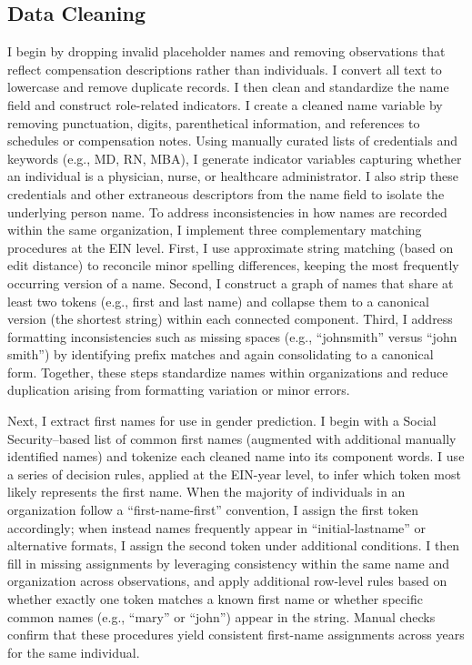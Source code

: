 \documentclass[12pt]{article}
\begin{document}
    \subsection{Data Cleaning}

    I begin by dropping invalid placeholder names and removing observations that reflect compensation descriptions rather than individuals. I convert all text to lowercase and remove duplicate records. I then clean and standardize the name field and construct role-related indicators. I create a cleaned name variable by removing punctuation, digits, parenthetical information, and references to schedules or compensation notes. Using manually curated lists of credentials and keywords (e.g., MD, RN, MBA), I generate indicator variables capturing whether an individual is a physician, nurse, or healthcare administrator. I also strip these credentials and other extraneous descriptors from the name field to isolate the underlying person name. To address inconsistencies in how names are recorded within the same organization, I implement three complementary matching procedures at the EIN level. First, I use approximate string matching (based on edit distance) to reconcile minor spelling differences, keeping the most frequently occurring version of a name. Second, I construct a graph of names that share at least two tokens (e.g., first and last name) and collapse them to a canonical version (the shortest string) within each connected component. Third, I address formatting inconsistencies such as missing spaces (e.g., “johnsmith” versus “john smith”) by identifying prefix matches and again consolidating to a canonical form. Together, these steps standardize names within organizations and reduce duplication arising from formatting variation or minor errors.

    Next, I extract first names for use in gender prediction. I begin with a Social Security–based list of common first names (augmented with additional manually identified names) and tokenize each cleaned name into its component words. I use a series of decision rules, applied at the EIN-year level, to infer which token most likely represents the first name. When the majority of individuals in an organization follow a “first-name-first” convention, I assign the first token accordingly; when instead names frequently appear in “initial-lastname” or alternative formats, I assign the second token under additional conditions. I then fill in missing assignments by leveraging consistency within the same name and organization across observations, and apply additional row-level rules based on whether exactly one token matches a known first name or whether specific common names (e.g., “mary” or “john”) appear in the string. Manual checks confirm that these procedures yield consistent first-name assignments across years for the same individual.
\end{document}
